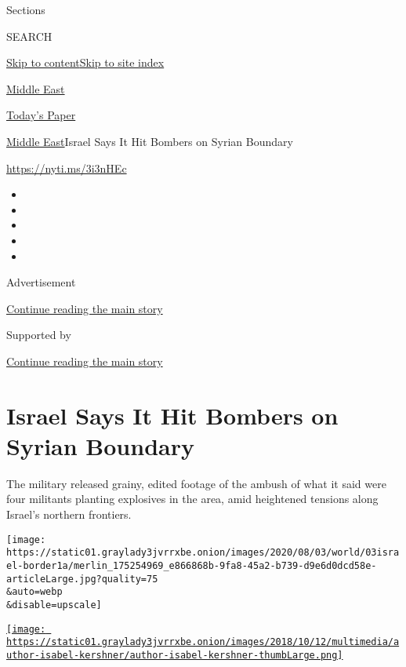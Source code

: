 Sections

SEARCH

\protect\hyperlink{site-content}{Skip to
content}\protect\hyperlink{site-index}{Skip to site index}

\href{https://www.nytimes3xbfgragh.onion/section/world/middleeast}{Middle
East}

\href{https://myaccount.nytimes3xbfgragh.onion/auth/login?response_type=cookie\&client_id=vi}{}

\href{https://www.nytimes3xbfgragh.onion/section/todayspaper}{Today's
Paper}

\href{/section/world/middleeast}{Middle East}\textbar{}Israel Says It
Hit Bombers on Syrian Boundary

\url{https://nyti.ms/3i3nHEc}

\begin{itemize}
\item
\item
\item
\item
\item
\end{itemize}

Advertisement

\protect\hyperlink{after-top}{Continue reading the main story}

Supported by

\protect\hyperlink{after-sponsor}{Continue reading the main story}

\hypertarget{israel-says-it-hit-bombers-on-syrian-boundary}{%
\section{Israel Says It Hit Bombers on Syrian
Boundary}\label{israel-says-it-hit-bombers-on-syrian-boundary}}

The military released grainy, edited footage of the ambush of what it
said were four militants planting explosives in the area, amid
heightened tensions along Israel's northern frontiers.

\texttt{[image: https://static01.graylady3jvrrxbe.onion/images/2020/08/03/world/03israel-border1a/merlin\_175254969\_e866868b-9fa8-45a2-b739-d9e6d0dcd58e-articleLarge.jpg?quality=75\\\&auto=webp\\\&disable=upscale]}

\href{https://www.nytimes3xbfgragh.onion/by/isabel-kershner}{\texttt{[image: https://static01.graylady3jvrrxbe.onion/images/2018/10/12/multimedia/author-isabel-kershner/author-isabel-kershner-thumbLarge.png]}}

